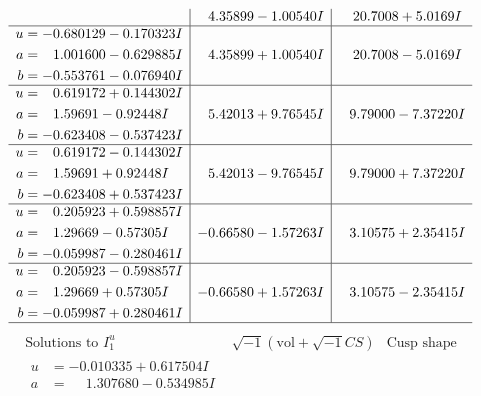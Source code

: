 \documentclass[1p]{elsarticle_modified}
\theoremstyle{definition}
\newcommand{\I}{\sqrt{-1}}
\begin{document}
$$\begin{array}{c|c|c}
 & \phantom{-}4.35899 - 1.00540 I & \phantom{-}20.7008 + 5.0169 I \\ \hline\begin{aligned}
u &= -0.680129 - 0.170323 I \\
a &= \phantom{-}1.001600 - 0.629885 I \\
b &= -0.553761 - 0.076940 I\end{aligned}
 & \phantom{-}4.35899 + 1.00540 I & \phantom{-}20.7008 - 5.0169 I \\ \hline\begin{aligned}
u &= \phantom{-}0.619172 + 0.144302 I \\
a &= \phantom{-}1.59691 - 0.92448 I \\
b &= -0.623408 - 0.537423 I\end{aligned}
 & \phantom{-}5.42013 + 9.76545 I & \phantom{-}9.79000 - 7.37220 I \\ \hline\begin{aligned}
u &= \phantom{-}0.619172 - 0.144302 I \\
a &= \phantom{-}1.59691 + 0.92448 I \\
b &= -0.623408 + 0.537423 I\end{aligned}
 & \phantom{-}5.42013 - 9.76545 I & \phantom{-}9.79000 + 7.37220 I \\ \hline\begin{aligned}
u &= \phantom{-}0.205923 + 0.598857 I \\
a &= \phantom{-}1.29669 - 0.57305 I \\
b &= -0.059987 - 0.280461 I\end{aligned}
 & -0.66580 - 1.57263 I & \phantom{-}3.10575 + 2.35415 I \\ \hline\begin{aligned}
u &= \phantom{-}0.205923 - 0.598857 I \\
a &= \phantom{-}1.29669 + 0.57305 I \\
b &= -0.059987 + 0.280461 I\end{aligned}
 & -0.66580 + 1.57263 I & \phantom{-}3.10575 - 2.35415 I\\
 \hline 
 \end{array}$$\newpage$$\begin{array}{c|c|c}  
\text{Solutions to }I^u_{1}& \I (\text{vol} + \sqrt{-1}CS) & \text{Cusp shape}\\
 \hline 
\begin{aligned}
u &= -0.010335 + 0.617504 I \\
a &= \phantom{-}1.307680 - 0.534985 I \\

\end{aligned}
\end{array}$$
\end{document}
